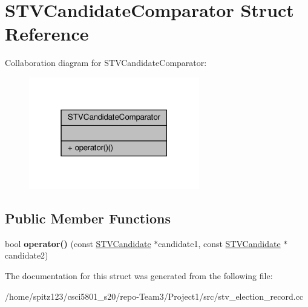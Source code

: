 \hypertarget{structSTVCandidateComparator}{}\section{S\+T\+V\+Candidate\+Comparator Struct Reference}
\label{structSTVCandidateComparator}


Collaboration diagram for S\+T\+V\+Candidate\+Comparator\+:
\nopagebreak
\begin{figure}[H]
\begin{center}
\leavevmode
\includegraphics[width=211pt]{structSTVCandidateComparator__coll__graph}
\end{center}
\end{figure}
\subsection*{Public Member Functions}
\begin{DoxyCompactItemize}
\item 
\mbox{\label{structSTVCandidateComparator_ae101b7fd783e113484311eb2d501f528}} 
bool {\bfseries operator()} (const \hyperlink{classSTVCandidate}{S\+T\+V\+Candidate} $\ast$candidate1, const \hyperlink{classSTVCandidate}{S\+T\+V\+Candidate} $\ast$candidate2)
\end{DoxyCompactItemize}


The documentation for this struct was generated from the following file\+:\begin{DoxyCompactItemize}
\item 
/home/spitz123/csci5801\+\_\+s20/repo-\/\+Team3/\+Project1/src/stv\+\_\+election\+\_\+record.\+cc\end{DoxyCompactItemize}
